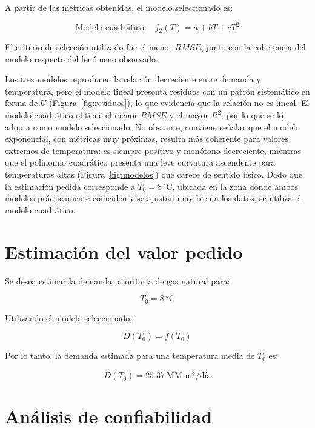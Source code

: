 \documentclass[12pt,a4paper]{article}
\newcommand{\unidadDemanda}{\text{MM m}^3/\text{día}}
\newcommand{\unidadTemp}{^\circ\text{C}}
\begin{document}
A partir de las métricas obtenidas, el modelo seleccionado es:

\[
    \boxed{\text{Modelo cuadrático:}\quad f_2(T)=a+bT+cT^2}
\]

El criterio de selección utilizado fue el menor \(RMSE\), junto con la coherencia del modelo respecto del fenómeno observado.

Los tres modelos reproducen la relación decreciente entre demanda y temperatura, pero el modelo lineal presenta residuos con un patrón sistemático en forma de \(U\) (Figura~\ref{fig:residuos}), lo que evidencia que la relación no es lineal. El modelo cuadrático obtiene el menor \(RMSE\) y el mayor \(R^2\), por lo que se lo adopta como modelo seleccionado. No obstante, conviene señalar que el modelo exponencial, con métricas muy próximas, resulta más coherente para valores extremos de temperatura: es siempre positivo y monótono decreciente, mientras que el polinomio cuadrático presenta una leve curvatura ascendente para temperaturas altas (Figura~\ref{fig:modelos}) que carece de sentido físico. Dado que la estimación pedida corresponde a \(T_0 = 8\,\unidadTemp\), ubicada en la zona donde ambos modelos prácticamente coinciden y se ajustan muy bien a los datos, se utiliza el modelo cuadrático.

\section{Estimación del valor pedido}

Se desea estimar la demanda prioritaria de gas natural para:

\[
    T_0 = \boxed{8} \ \unidadTemp
\]

Utilizando el modelo seleccionado:

\[
    D(T_0)=f(T_0)
\]

\begin{table}[H]
\centering
\caption{Estimación final}
\label{tab:estimacion-final}

\end{table}

Por lo tanto, la demanda estimada para una temperatura media de \(T_0\) es:

\[
    \boxed{D(T_0)=\num{25.37} \ \unidadDemanda}
\]

\section{Análisis de confiabilidad}
\end{document}
